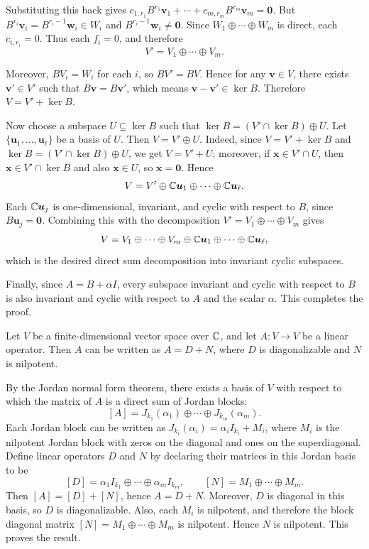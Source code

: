 \begin{proofenv}
    Substituting this back gives $c_{1,r_1}B^{r_1}\bm v_1+\cdots+c_{m,r_m}B^{r_m}\bm v_m=\bm 0$. But $B^{r_i}\bm v_i=B^{r_i-1}\bm w_i\in W_i$ and $B^{r_i-1}\bm w_i\ne\bm 0$. Since $W_1\oplus\cdots\oplus W_m$ is direct, each $c_{i,r_i}=0$. Thus each $f_i=0$, and therefore
    $$
    V'=V_1\oplus\cdots\oplus V_m.
    $$

    Moreover, $BV_i=W_i$ for each $i$, so $BV'=BV$. Hence for any $\bm v\in V$, there exists $\bm v'\in V'$ such that $B\bm v=B\bm v'$, which means $\bm v-\bm v'\in\ker B$. Therefore $V=V'+\ker B$.

    Now choose a subspace $U\subseteq\ker B$ such that $\ker B=(V'\cap\ker B)\oplus U$. Let $\{\bm u_1,\dots,\bm u_\ell\}$ be a basis of $U$. Then $V=V'\oplus U$. Indeed, since $V=V'+\ker B$ and $\ker B=(V'\cap\ker B)\oplus U$, we get $V=V'+U$; moreover, if $\bm x\in V'\cap U$, then $\bm x\in V'\cap\ker B$ and also $\bm x\in U$, so $\bm x=\bm 0$. Hence
    $$
    V=V'\oplus\mathbb{C}\bm u_1\oplus\cdots\oplus\mathbb{C}\bm u_\ell.
    $$
    Each $\mathbb{C}\bm u_j$ is one-dimensional, invariant, and cyclic with respect to $B$, since $B\bm u_j=\bm 0$. Combining this with the decomposition $V'=V_1\oplus\cdots\oplus V_m$ gives
    $$
    V=V_1\oplus\cdots\oplus V_m\oplus\mathbb{C}\bm u_1\oplus\cdots\oplus\mathbb{C}\bm u_\ell,
    $$
    which is the desired direct sum decomposition into invariant cyclic subspaces.

    Finally, since $A=B+\alpha I$, every subspace invariant and cyclic with respect to $B$ is also invariant and cyclic with respect to $A$ and the scalar $\alpha$. This completes the proof.
\end{proofenv}
\begin{corollaryenv}
    Let $V$ be a finite-dimensional vector space over $\mathbb{C}$, and let $A:V\to V$ be a linear operator. Then $A$ can be written as $A=D+N$, where $D$ is diagonalizable and $N$ is nilpotent.
\end{corollaryenv}
\begin{proofenv}
    By the Jordan normal form theorem, there exists a basis of $V$ with respect to which the matrix of $A$ is a direct sum of Jordan blocks:
    $$
    [A]=J_{k_1}(\alpha_1)\oplus\cdots\oplus J_{k_m}(\alpha_m).
    $$
    Each Jordan block can be written as
    $J_{k_i}(\alpha_i)=\alpha_i I_{k_i}+M_i$, where $M_i$ is the nilpotent Jordan block with zeros on the diagonal and ones on the superdiagonal. Define linear operators $D$ and $N$ by declaring their matrices in this Jordan basis to be
    $$
    [D]=\alpha_1 I_{k_1}\oplus\cdots\oplus \alpha_m I_{k_m},
    \qquad
    [N]=M_1\oplus\cdots\oplus M_m.
    $$
    Then $[A]=[D]+[N]$, hence $A=D+N$. Moreover, $D$ is diagonal in this basis, so $D$ is diagonalizable. Also, each $M_i$ is nilpotent, and therefore the block diagonal matrix $[N]=M_1\oplus\cdots\oplus M_m$ is nilpotent. Hence $N$ is nilpotent. This proves the result.
\end{proofenv}
